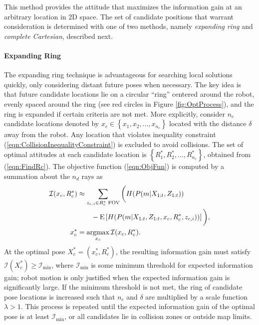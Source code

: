 \documentclass[smallextended]{svjour3}       %
\newcommand{\braces}[1]{\ensuremath{\left\{ #1 \right\}}}
\newcommand{\refeqn}[1]{(\ref{eqn:#1})}
\newcommand{\argmax}{\operatornamewithlimits{argmax}}
\begin{document}
This method provides the attitude that maximizes the information gain at an arbitrary location in 2D space. The set of candidate positions that warrant consideration is determined with one of two methods, namely \emph{expanding ring} and \emph{complete Cartesian}, described next.

\paragraph{Expanding Ring}
The expanding ring technique is advantageous for searching local solutions quickly, only considering distant future poses when necessary. The key idea is that future candidate locations lie on a circular ``ring'' centered around the robot, evenly spaced around the ring (see red circles in Figure \ref{fig:OptProcess}), and the ring is expanded if certain criteria are not met. More explicitly, consider $n_c$ candidate locations denoted by $x_c\in\braces{x_1,x_2,\ldots,x_{n_c}}$ located with the distance $\delta$ away from the robot. Any location that violates inequality constraint \refeqn{CollisionInequalityConstraint} is excluded to avoid collisions. The set of optimal attitudes at each candidate location is $\braces{R^*_{1},R^*_{2},\ldots,R^*_{n_c}}$, obtained from \refeqn{FindRc}. The objective function \refeqn{ObjFun} is computed by a summation about the $n_d$ rays as %
\begin{align}
\label{eqn:ObjFunApprox}
\mathcal I(x_c,R_c^*)&\approx \sum_{z_{c,i}\in R_{c}^*\text{ FOV}}\bigg(H(P(m|X_{1:t},Z_{1:t}))\nonumber\\&\qquad-\text{E}\left[H(P(m|X_{1:t},Z_{1:t},x_c,R_c^*,z_{c,i}))\right]\bigg),
\\
x_c^*&=\argmax_{x_c}\mathcal I(x_c,R_c^*).
\end{align}
At the optimal pose $X^*_c=(x^*_c,R^*_c)$, the resulting information gain must satisfy $\mathcal I(X_c^*)\geq\mathcal I_\text{min}$, where $\mathcal I_\text{min}$ is some minimum threshold for expected information gain; robot motion is only justified when the expected information gain is significantly large. If the minimum threshold is not met, the ring of candidate pose locations is increased such that $n_c$ and $\delta$ are multiplied by a scale function $\lambda>1$.
This process is repeated until the expected information gain of the optimal pose is at least $\mathcal I_\text{min}$, or all candidates lie in collision zones or outside map limits. %
\end{document}
